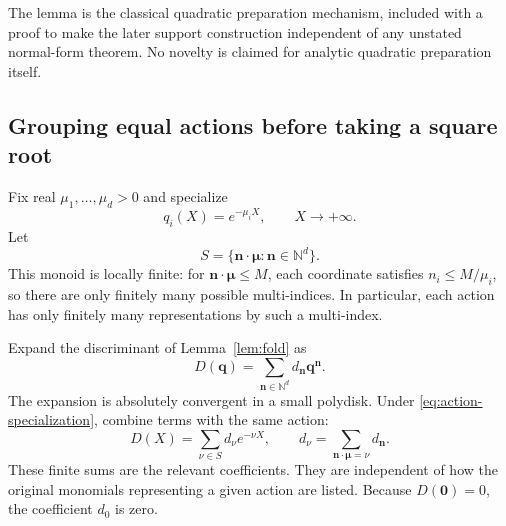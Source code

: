 \documentclass[11pt,a4paper]{article}
\theoremstyle{definition}
\theoremstyle{remark}
\newcommand{\N}{\mathbb N}
\begin{document}
The lemma is the classical quadratic preparation mechanism, included
with a proof to make the later support construction independent of any
unstated normal-form theorem. No novelty is claimed for analytic
quadratic preparation itself.

\subsection{Grouping equal actions before taking a square root}
Fix real $\mu_1,\ldots,\mu_d>0$ and specialize
\begin{equation}\label{eq:action-specialization}
 q_i(X)=e^{-\mu_iX},\qquad X\to+\infty.
\end{equation}
Let
\begin{equation}\label{eq:S}
 S=\{\bm n\cdot\bm\mu:\bm n\in\N^d\}.
\end{equation}
This monoid is locally finite: for $\bm n\cdot\bm\mu\le M$, each
coordinate satisfies $n_i\le M/\mu_i$, so there are only finitely many
possible multi-indices. In particular, each action has only finitely
many representations by such a multi-index.

Expand the discriminant of Lemma~\ref{lem:fold} as
\[
 D(\bm q)=\sum_{\bm n\in\N^d}d_{\bm n}\bm q^{\bm n}.
\]
The expansion is absolutely convergent in a small polydisk. Under
\eqref{eq:action-specialization}, combine terms with the same action:
\begin{equation}\label{eq:grouped-D}
 D(X)=\sum_{\nu\in S}d_\nu e^{-\nu X},\qquad
 d_\nu=\sum_{\bm n\cdot\bm\mu=\nu}d_{\bm n}.
\end{equation}
These finite sums are the relevant coefficients. They are independent
of how the original monomials representing a given action are listed.
Because $D(\bm0)=0$, the coefficient $d_0$ is zero.
\end{document}
